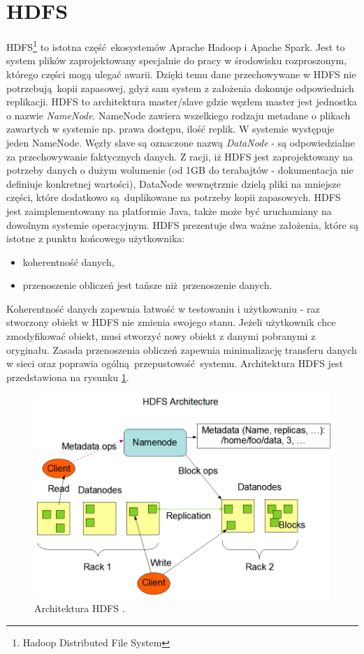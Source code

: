 \section{HDFS}
HDFS\footnote{Hadoop Distributed File System} to istotna część ekosystemów Aprache Hadoop i Apache Spark. Jest to system plików zaprojektowany specjalnie do pracy w środowisku rozproszonym, którego części mogą ulegać awarii. Dzięki temu dane przechowywane w HDFS nie potrzebują kopii zapasowej, gdyż sam system z założenia dokonuje odpowiednich replikacji. HDFS to architektura master/slave gdzie węzłem master jest jednostka o nazwie \textit{NameNode}. NameNode zawiera wszelkiego rodzaju metadane o plikach zawartych w systemie np. prawa dostępu, ilość replik. W systemie występuje jeden NameNode. Węzły slave są oznaczone nazwą \textit{DataNode} - są odpowiedzialne za przechowywanie faktycznych danych. Z racji, iż HDFS jest zaprojektowany na potrzeby danych o dużym wolumenie (od 1GB do terabajtów - dokumentacja nie definiuje konkretnej wartości), DataNode wewnętrznie dzielą pliki na mniejsze części, które dodatkowo są duplikowane na potrzeby kopii zapasowych. HDFS jest zaimplementowany na platformie Java, także może być uruchamiany na dowolnym systemie operacyjnym. HDFS prezentuje dwa ważne założenia, które są istotne z punktu końcowego użytkownika:
\begin{itemize}
	\item koherentność danych,
	\item przenoszenie obliczeń jest tańsze niż przenoszenie danych.
\end{itemize}
Koherentność danych zapewnia łatwość w testowaniu i użytkowaniu - raz stworzony obiekt w HDFS nie zmienia swojego stanu. Jeżeli użytkownik chce zmodyfikować obiekt, musi stworzyć nowy obiekt z danymi pobranymi z oryginału. Zasada przenoszenia obliczeń zapewnia minimalizację transferu danych w sieci oraz poprawia ogólną przepustowość systemu\cite{HDFS}. Architektura HDFS jest przedstawiona na rysunku \ref{fig:@=hdfs_architecture}.
\begin{figure}
	\centering
	\includegraphics[scale=0.3]{hdfsarchitecture.png}
	\caption{Architektura HDFS \cite{HDFS_architecture}.}
	\label{fig:@=hdfs_architecture}
\end{figure}
